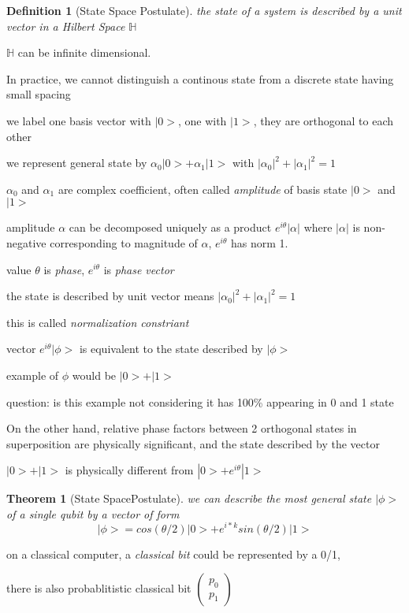 \documentclass[10pt]{article}
\theoremstyle{break}
\newtheorem{thm}{Theorem}[subsection]
\newtheorem{defn}{Definition}[subsection]
\begin{document}
\begin{defn}[State Space Postulate]
    the state of a system is described by a unit vector in a Hilbert Space $\mathbb{H}$
\end{defn}

$\mathbb{H}$ can be infinite dimensional.

In practice, we cannot distinguish a continous state from a discrete state having small spacing

we label one basis vector with $|0>$, one with $|1>$, they are orthogonal to each other

we represent general state by $\alpha_0 |0>+\alpha_1 |1>$
with $|\alpha_0|^2+|\alpha_1|^2=1$

$\alpha_0$ and $\alpha_1$ are complex coefficient, often called \emph{amplitude} of basis state $|0>$ and $|1>$

amplitude $\alpha$ can be decomposed uniquely as a product $e^{i\theta}|\alpha|$
where $|\alpha|$ is non-negative corresponding to magnitude of $\alpha$,
$e^{i\theta}$ has norm 1.

value $\theta$ is \emph{phase}, $e^{i\theta}$ is \emph{phase vector}

the state is described by unit vector means $|\alpha_0|^2+|\alpha_1|^2=1$

this is called \emph{normalization constriant}

vector $e^{i\theta}|\phi>$ is equivalent to the state described by $|\phi>$

example of $\phi$ would be $|0> + |1>$

question: is this example not considering it has 100\% appearing in 0 and 1 state

On the other hand, relative phase factors between 2 orthogonal states in superposition
are physically significant, and the state described by the vector

$|0>+|1>$ is physically different from $|0>+e^{i\theta}|1>$

\begin{thm}[State SpacePostulate]
    we can describe the most general state $|\phi>$ of a single qubit by a vector of form 
    $$|\phi>=cos(\theta/2)|0> + e^{i*k}sin(\theta/2)|1>$$
\end{thm}


on a classical computer, a \emph{classical bit} could be represented by a 0/1,

there is also probablitistic classical bit
$\begin{pmatrix}
    p_0\\p_1
\end{pmatrix}$
\end{document}
